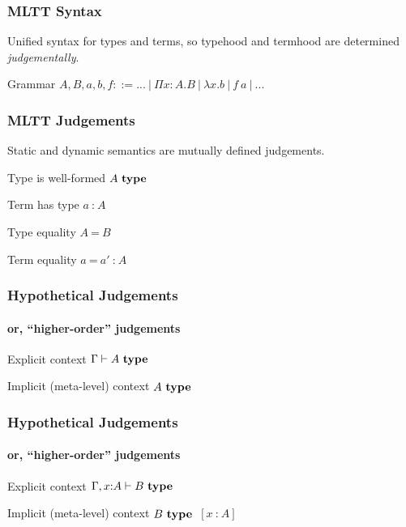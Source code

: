\documentclass[mathserif,usenames,dvipsnames]{beamer}
\newcommand{\istype}[1]{\ensuremath{#1 ~\textbf{\textrm{type}}}}
\newcommand{\isterm}[2]{\ensuremath{#1 ~\textbf{{:}}~ #2}}
\newcommand{\eqtype}[2]{\ensuremath{#1 ~\textbf{=}~ #2}}
\newcommand{\eqterm}[3]{\ensuremath{#1 ~\textbf{=}~ #2 ~\textbf{{:}}~ #3}}
\newcommand{\hyps}[1]{\ensuremath{~[#1]}}
\newcommand{\hyp}[1]{\hyps{\isterm{x}{#1}}}
\newcommand{\Funv}[3]{\ensuremath{\Pi #1{:}#2. #3}}
\newcommand{\Fun}[2]{\Funv{x}{#1}{#2}}
\newcommand{\funv}[2]{\ensuremath{\lambda #1. #2}}
\newcommand{\fun}[1]{\funv{x}{#1}}
\newcommand{\app}[2]{\ensuremath{#1~#2}}
\begin{document}
\begin{frame}
\frametitle{MLTT Syntax}

Unified syntax for types and terms,
so typehood and termhood are determined \textit{judgementally}.

\begin{block}{Grammar}
$A,B,a,b,f ::= ...~|~\Fun{A}{B}~|~\fun{b}~|~\app{f}{a}~|~...$
\end{block}

\end{frame}


\begin{frame}
\frametitle{MLTT Judgements}

Static and dynamic semantics are mutually defined judgements.

\begin{block}{Type is well-formed}
\istype{A}
\end{block}

\begin{block}{Term has type}
\isterm{a}{A}
\end{block}

\begin{block}{Type equality}
\eqtype{A}{B}
\end{block}

\begin{block}{Term equality}
\eqterm{a}{a'}{A}
\end{block}

\end{frame}

\begin{frame}
\frametitle{Hypothetical Judgements}
\framesubtitle{or, ``higher-order'' judgements}

\begin{block}{Explicit context}
$\Gamma \vdash \istype{A}$
\end{block}

\begin{block}{Implicit (meta-level) context}
\istype{A}
\end{block}

\end{frame}

\begin{frame}
\frametitle{Hypothetical Judgements}
\framesubtitle{or, ``higher-order'' judgements}

\begin{block}{Explicit context}
$\Gamma, x{:}A \vdash \istype{B}$
\end{block}

\begin{block}{Implicit (meta-level) context}
\istype{B} \hyp{A}
\end{block}

\end{frame}
\end{document}
